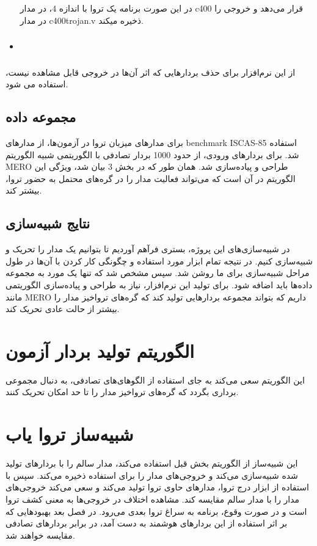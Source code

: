 \begin{itemize}
\begin{center}
		
	\end{center}
	در این صورت برنامه یک تروا با اندازه 4، در مدار c400 قرار می‌دهد و خروجی را در مدار c400trojan.v ذخیره میکند.
	\item \subsubsection{}
	
\end{itemize}
از این نرم‌افزار برای حذف بردارهایی که اثر آن‌ها در خروجی قابل مشاهده نیست، استفاده می شود.
\newpage
		
		
\subsection{مجموعه ‌داده}
برای مدارهای میزبان تروا در آزمون‌ها، از مدارهای benchmark ISCAS-85 استفاده شد. 
برای بردارهای ورودی، از حدود 1000 بردار تصادفی با الگوریتمی شبیه الگوریتم MERO طراحی و پیاده‌سازی شد. همان طور که در بخش 3 بیان شد، ویژگی این الگوریتم در آن است که می‌تواند فعالیت مدار را در گره‌های محتمل به حضور تروا، بیشتر کند.
\subsection{نتایج شبیه‌سازی}
در شبیه‌سازی‌ها‌‌ی این پروژه، بستری فرآهم آوردیم تا بتوانیم یک مدار را تحریک و شبیه‌سازی کنیم. در نتیجه تمام ابزار مورد استفاده و چگونگی کار کردن با آن‌ها در طول مراحل شبیه‌سازی برای ما روشن شد. سپس مشخص شد که تنها یک مورد به مجموعه داده‌ها باید اضافه شود. برای تولید این نرم‌افزار، نیاز به طراحی و پیاده‌سازی الگوریتمی مانند MERO داریم که بتواند مجموعه بردارهایی تولید کند که گره‌های تروا‌خیز مدار را بیشتر از حالت عادی تحریک کند.
\section{الگوریتم تولید بردار آزمون} 
این الگوریتم سعی می‌کند به جای استفاده از الگوهای‌های تصادفی، به دنبال مجموعی برداری بگردد که گره‌های تروا‌خیز مدار را تا حد امکان تحریک کنند.
\section{شبیه‌ساز تروا یاب} 
این شبیه‌ساز از الگوریتم بخش قبل استفاده می‌کند، مدار سالم را با بردارهای تولید شده شبیه‌سازی می‌کند و خروجی‌های مدار را برای استفاده ذخیره می‌کند. سپس با استفاده از ابزار درج تروا، مدارهای حاوی تروا تولید می‌کند و سعی می‌کند خروجی‌های مدار را با مدار سالم مقایسه کند. مشاهده اختلاف در خروجی‌ها به معنی کشف تروا است و در صورت وقوع، برنامه به سراغ تروا بعدی می‌رود. در فصل بعد بهبودهایی که بر اثر استفاده از این بردارهای هوشمند به دست آمد، در برابر بردارهای تصادفی مقایسه خواهند شد.
